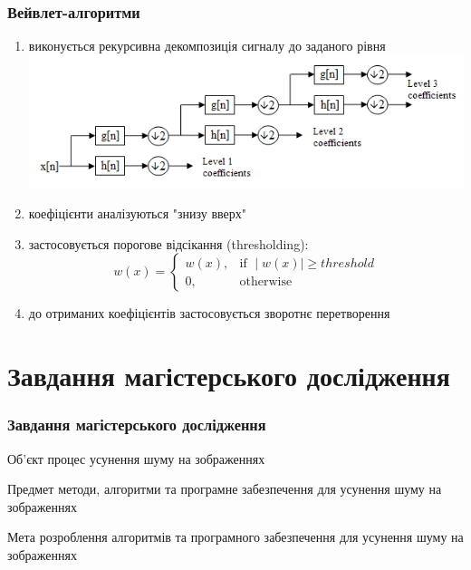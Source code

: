 \documentclass[12pt]{beamer}
\begin{document}
\begin{frame}\frametitle{Вейвлет-алгоритми}
	\begin{enumerate}
		\item виконується рекурсивна декомпозиція сигналу до заданого рівня\linebreak
		\includegraphics[scale=0.3]{images/filter_bank} \linebreak
		\item коефіцієнти аналізуються "знизу вверх" 
		\item застосовується порогове відсікання (thresholding): \linebreak
		\[
		w(x)= 
		\begin{cases}
		w(x),& \text{if } \mid{w(x)}\mid \geq threshold\\
		0,              & \text{otherwise}
		\end{cases}
		\]
		\item до отриманих коефіцієнтів застосовується зворотнє перетворення
	\end{enumerate}
\end{frame}

\section{Завдання магістерського дослідження}
\begin{frame}\frametitle{Завдання магістерського дослідження}
	\begin{block}{Об'єкт}
		процес усунення шуму на зображеннях
	\end{block}
	\begin{block}{Предмет}
		методи, алгоритми та програмне забезпечення для усунення шуму на зображеннях
	\end{block}
	\begin{block}{Мета}
		розроблення алгоритмів та програмного забезпечення для усунення шуму на зображеннях
	\end{block}
\end{frame}
\end{document}
